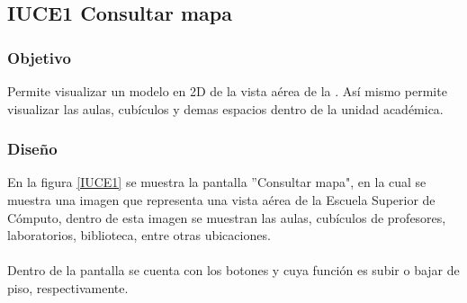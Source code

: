 \subsection{IUCE1 Consultar mapa}

\subsubsection{Objetivo}

Permite visualizar un modelo en 2D de la vista aérea de la . Así mismo permite visualizar las aulas, cubículos y demas espacios dentro de la unidad académica.

\subsubsection{Diseño}

En la figura \ref{IUCE1} se muestra la pantalla ''Consultar mapa", en la cual se muestra una imagen que representa una vista aérea de la Escuela Superior de Cómputo, dentro de esta imagen se muestran las aulas, cubículos de profesores, laboratorios, biblioteca, entre otras ubicaciones. \\ \\
\indent Dentro de la pantalla se cuenta con los botones \btnArriba{} y \btnAbajo{} cuya función es subir o bajar de piso, respectivamente.


